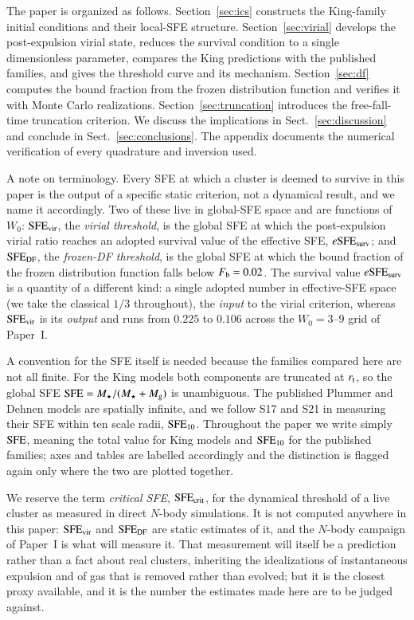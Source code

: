 \documentclass{aa}
\newcommand{\esfe}{e{\rm SFE}}
\newcommand{\sfe}{{\rm SFE}}
\newcommand{\rtid}{r_{\rm t}}
\begin{document}
The paper is organized as follows. Section~\ref{sec:ics} constructs the
King-family initial conditions and their local-SFE structure.
Section~\ref{sec:virial} develops the post-expulsion virial state,
reduces the survival condition to a single dimensionless parameter,
compares the King predictions with the published families, and gives the
threshold curve and its mechanism. Section~\ref{sec:df} computes the
bound fraction from the frozen distribution function and verifies it with
Monte Carlo realizations. Section~\ref{sec:truncation} introduces the
free-fall-time truncation criterion. We discuss the implications in
Sect.~\ref{sec:discussion} and conclude in Sect.~\ref{sec:conclusions}.
The appendix documents the numerical verification of every quadrature
and inversion used.

A note on terminology. Every SFE at which a cluster is deemed to survive
in this paper is the output of a specific static criterion, not a
dynamical result, and we name it accordingly. Two of these live in
global-SFE space and are functions of $W_0$: $\sfe_{\rm vir}$, the
\emph{virial threshold}, is the global SFE at which the post-expulsion
virial ratio reaches an adopted survival value of the effective SFE,
$\esfe_{\rm surv}$; and $\sfe_{\rm DF}$, the \emph{frozen-DF threshold},
is the global SFE at which the bound fraction of the frozen distribution
function falls below $F_{\rm b}=0.02$. The survival value
$\esfe_{\rm surv}$ is a quantity of a different kind: a single adopted
number in effective-SFE space (we take the classical $1/3$ throughout),
the \emph{input} to the virial criterion, whereas $\sfe_{\rm vir}$ is its
\emph{output} and runs from $0.225$ to $0.106$ across the $W_0=3$--$9$
grid of Paper~I.

A convention for the SFE itself is needed because the families compared
here are not all finite. For the King models both components are
truncated at $\rtid$, so the global SFE
$\sfe=M_\star/(M_\star+M_{\rm g})$ is unambiguous. The published Plummer
and Dehnen models are spatially infinite, and we follow S17 and S21 in
measuring their SFE within ten scale radii, $\sfe_{10}$. Throughout the
paper we write simply $\sfe$, meaning the total value for King models and
$\sfe_{10}$ for the published families; axes and tables are labelled
accordingly and the distinction is flagged again only where the two are
plotted together.

We reserve the term \emph{critical SFE}, $\sfe_{\rm crit}$, for the
dynamical threshold of a live cluster as measured in direct $N$-body
simulations. It is not computed anywhere in this paper:
$\sfe_{\rm vir}$ and $\sfe_{\rm DF}$ are static estimates of it, and the
$N$-body campaign of Paper~I is what will measure it. That measurement
will itself be a prediction rather than a fact about real clusters,
inheriting the idealizations of instantaneous expulsion and of gas that
is removed rather than evolved; but it is the closest proxy available,
and it is the number the estimates made here are to be judged against.
\end{document}
